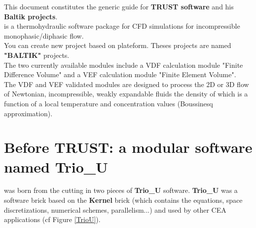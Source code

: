 This document constitutes the generic guide for \textbf{TRUST software} and his \textbf{Baltik projects}.\\

\trust is a thermohydraulic software package for CFD simulations for incompressible monophasic/diphasic flow.\\

You can create new project based on \trust plateform. Theses projects are named \textbf{"BALTIK"} projects.\\

The two currently available modules include a VDF calculation module "Finite Difference Volume" and a VEF calculation module "Finite Element Volume". \\

The VDF and VEF validated modules are designed to process the 2D or 3D flow of Newtonian, incompressible, weakly expandable fluids the density of which is a function of a local temperature and concentration values (Boussinesq approximation).



\section{Before TRUST: a modular software named Trio\_U}

\trust was born from the cutting in two pieces of \textbf{Trio\_U} software.
\textbf{Trio\_U} was a software brick based on the \textbf{Kernel} brick (which contains the equations, space discretizations, numerical schemes, parallelism...) and used by other CEA applications (cf Figure \ref{TrioU}).

